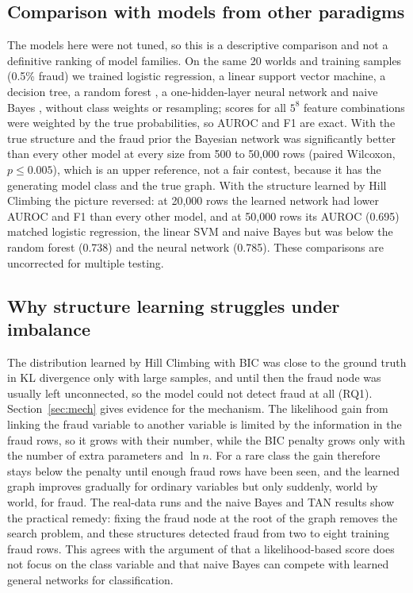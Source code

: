 \documentclass[final,5p,times,authoryear]{elsarticle}
\begin{document}
\subsection{Comparison with models from other paradigms}\label{sec:bench}
The models here were not tuned, so this is a descriptive comparison and not a definitive ranking of model families. On the same 20 worlds and training samples (0.5\% fraud) we trained logistic regression, a linear support vector machine, a decision tree, a random forest \citep{breiman2001}, a one-hidden-layer neural network and naive Bayes \citep{friedman1997}, without class weights or resampling; scores for all $5^8$ feature combinations were weighted by the true probabilities, so AUROC and F1 are exact. With the true structure and the fraud prior the Bayesian network was significantly better than every other model at every size from 500 to 50,000 rows (paired Wilcoxon, $p\le0.005$), which is an upper reference, not a fair contest, because it has the generating model class and the true graph. With the structure learned by Hill Climbing the picture reversed: at 20,000 rows the learned network had lower AUROC and F1 than every other model, and at 50,000 rows its AUROC (0.695) matched logistic regression, the linear SVM and naive Bayes but was below the random forest (0.738) and the neural network (0.785). These comparisons are uncorrected for multiple testing.

\subsection{Why structure learning struggles under imbalance}
The distribution learned by Hill Climbing with BIC was close to the ground truth in KL divergence only with large samples, and until then the fraud node was usually left unconnected, so the model could not detect fraud at all (RQ1). Section~\ref{sec:mech} gives evidence for the mechanism. The likelihood gain from linking the fraud variable to another variable is limited by the information in the fraud rows, so it grows with their number, while the BIC penalty grows only with the number of extra parameters and $\ln n$. For a rare class the gain therefore stays below the penalty until enough fraud rows have been seen, and the learned graph improves gradually for ordinary variables but only suddenly, world by world, for fraud. The real-data runs and the naive Bayes and TAN results show the practical remedy: fixing the fraud node at the root of the graph removes the search problem, and these structures detected fraud from two to eight training fraud rows. This agrees with the argument of \citet{friedman1997} that a likelihood-based score does not focus on the class variable and that naive Bayes can compete with learned general networks for classification.
\end{document}
